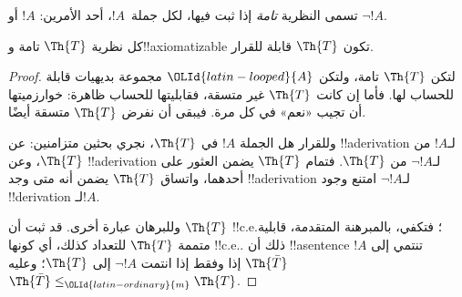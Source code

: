 \documentclass[../../../include/open-logic-section]{subfiles}
\begin{document}


تسمى النظرية {\em تامة} إذا ثبت فيها، لكل جملة~$!A$، أحد الأمرين:
$!A$ أو $\lnot !A$.

\begin{lem}
كل نظرية $\Th{T}$ تامة و!!{axiomatizable} تكون
$\Th{T}$ قابلة للقرار.
\end{lem}

\begin{proof}
لتكن $\Th{T}$ تامة، ولتكن $\OLId{latin-looped}{A}$ مجموعة بديهيات قابلة للحساب لها.
فأما إن كانت $\Th{T}$ غير متسقة، فقابليتها للحساب ظاهرة:
خوارزميتها أن تجيب «نعم» في كل مرة. فيبقى أن نفرض $\Th{T}$
متسقة أيضًا.

وللقرار هل الجملة $!A$ في $\Th{T}$، نجري بحثين متزامنين:
عن !!a{derivation} لـ$!A$ من $\Th{T}$، وعن !!a{derivation}
لـ$\lnot
!A$ من $\Th{T}$. فتمام $\Th{T}$ يضمن العثور على أحدهما،
واتساق $\Th{T}$ يضمن أنه متى وجد !!a{derivation} لـ$\lnot !A$
امتنع وجود !!{derivation} لـ$!A$.

وللبرهان عبارة أخرى. قد ثبت أن $\Th{T}$ !!{c.e.}؛ فتكفي، بالمبرهنة
المتقدمة، قابلية متممة $\Th{T}$ للتعداد كذلك، أي كونها
!!{c.e.}. ذلك أن !!a{sentence} $!A$ تنتمي إلى $\Th{\bar T}$ إذا
وفقط إذا انتمت $\lnot !A$ إلى $\Th{T}$؛ وعليه
$\Th{\bar T}\leq_\OLId{latin-ordinary}{m}\Th{T}$.
\end{proof}
\end{document}

